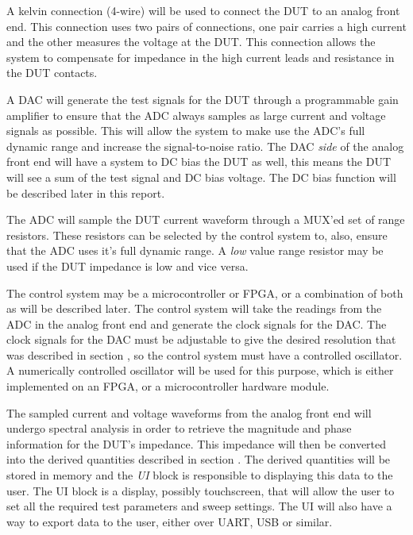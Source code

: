 A kelvin connection (4-wire) will be used to connect the DUT to an analog front end. This connection uses two pairs of connections, one pair carries a high current and the other measures the voltage at the DUT. This connection allows the system to compensate for impedance in the high current leads and resistance in the DUT contacts.

A DAC will generate the test signals for the DUT through a programmable gain amplifier to ensure that the ADC always samples as large current and voltage signals as possible. This will allow the system to make use the ADC's full dynamic range and increase the signal-to-noise ratio. The DAC \textit{side} of the analog front end will have a system to DC bias the DUT as well, this means the DUT will see a sum of the test signal and DC bias voltage. The DC bias function will be described later in this report.

The ADC will sample the DUT current waveform through a MUX'ed set of range resistors. These resistors can be selected by the control system to, also, ensure that the ADC uses it's full dynamic range. A \textit{low} value range resistor may be used if the DUT impedance is low and vice versa.

The control system may be a microcontroller or FPGA, or a combination of both as will be described later. The control system will take the readings from the ADC in the analog front end and generate the clock signals for the DAC. The clock signals for the DAC must be adjustable to give the desired resolution that was described in section , so the control system must have a controlled oscillator. A numerically controlled oscillator will be used for this purpose, which is either implemented on an FPGA, or a microcontroller hardware module. 

The sampled current and voltage waveforms from the analog front end will undergo spectral analysis in order to retrieve the magnitude and phase information for the DUT's impedance. This impedance will then be converted into the derived quantities described in section . The derived quantities will be stored in memory and the \textit{UI} block is responsible to displaying this data to the user. The UI block is a display, possibly touchscreen, that will allow the user to set all the required test parameters and sweep settings. The UI will also have a way to export data to the user, either over UART, USB or similar. 
